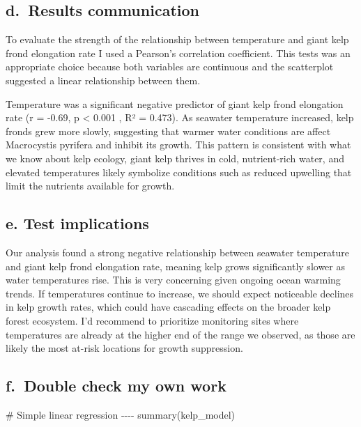 \documentclass[
  letterpaper,
  DIV=11,
  numbers=noendperiod]{scrartcl}
\newenvironment{Shaded}{\begin{snugshade}}{\end{snugshade}}
\newcommand{\CommentTok}[1]{\textcolor[rgb]{0.37,0.37,0.37}{#1}}
\newcommand{\FunctionTok}[1]{\textcolor[rgb]{0.28,0.35,0.67}{#1}}
\newcommand{\NormalTok}[1]{\textcolor[rgb]{0.00,0.23,0.31}{#1}}
\begin{document}
\subsection{d.~Results communication}\label{d.-results-communication}

To evaluate the strength of the relationship between temperature and
giant kelp frond elongation rate I used a Pearson's correlation
coefficient. This tests was an appropriate choice because both variables
are continuous and the scatterplot suggested a linear relationship
between them.

Temperature was a significant negative predictor of giant kelp frond
elongation rate (r = -0.69, p \textless{} 0.001 , R² = 0.473). As
seawater temperature increased, kelp fronds grew more slowly, suggesting
that warmer water conditions are affect Macrocystis pyrifera and inhibit
its growth. This pattern is consistent with what we know about kelp
ecology, giant kelp thrives in cold, nutrient-rich water, and elevated
temperatures likely symbolize conditions such as reduced upwelling that
limit the nutrients available for growth.

\subsection{e. Test implications}\label{e.-test-implications}

Our analysis found a strong negative relationship between seawater
temperature and giant kelp frond elongation rate, meaning kelp grows
significantly slower as water temperatures rise. This is very concerning
given ongoing ocean warming trends. If temperatures continue to
increase, we should expect noticeable declines in kelp growth rates,
which could have cascading effects on the broader kelp forest ecosystem.
I'd recommend to prioritize monitoring sites where temperatures are
already at the higher end of the range we observed, as those are likely
the most at-risk locations for growth suppression.

\subsection{f.~Double check my own
work}\label{f.-double-check-my-own-work}

\begin{Shaded}
\begin{Highlighting}[]
\CommentTok{\# Simple linear regression {-}{-}{-}{-}}
\FunctionTok{summary}\NormalTok{(kelp\_model)}
\end{Highlighting}
\end{Shaded}
\end{document}
